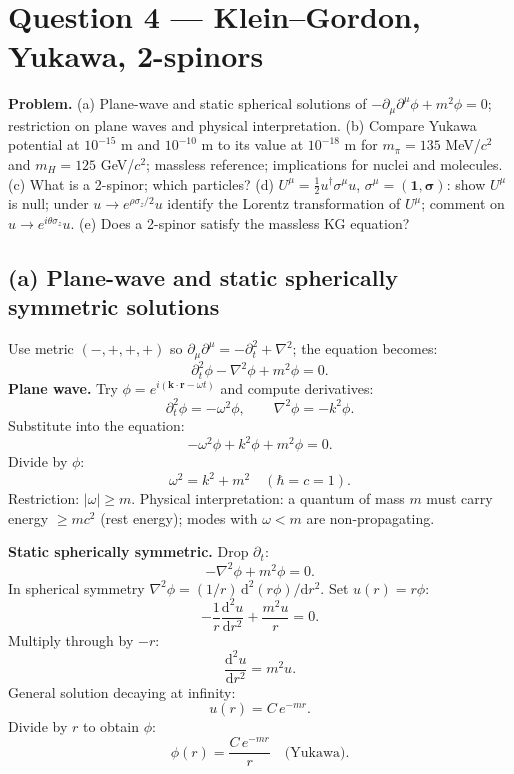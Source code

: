 \documentclass[11pt]{article}
\newcommand{\de}{\mathrm{d}}
\newcommand{\Lap}{\nabla^{2}}
\begin{document}
\section*{Question 4 --- Klein--Gordon, Yukawa, 2-spinors}

\textbf{Problem.} (a) Plane-wave and static spherical solutions of $-\partial_\mu\partial^\mu\phi+m^2\phi=0$; restriction on plane waves and physical interpretation. (b) Compare Yukawa potential at $10^{-15}$ m and $10^{-10}$ m to its value at $10^{-18}$ m for $m_\pi=135$ MeV/$c^2$ and $m_H=125$ GeV/$c^2$; massless reference; implications for nuclei and molecules. (c) What is a 2-spinor; which particles? (d) $U^\mu=\tfrac12 u^\dagger\sigma^\mu u$, $\sigma^\mu=(\bm 1,\bm\sigma)$: show $U^\mu$ is null; under $u\to e^{\rho\sigma_z/2}u$ identify the Lorentz transformation of $U^\mu$; comment on $u\to e^{i\theta\sigma_z}u$. (e) Does a 2-spinor satisfy the massless KG equation?

\subsection*{(a) Plane-wave and static spherically symmetric solutions}

Use metric $(-,+,+,+)$ so $\partial_\mu\partial^\mu = -\partial_t^2 + \Lap$; the equation becomes:
\[ \partial_t^2\phi - \Lap\phi + m^2\phi = 0. \]
\textbf{Plane wave.} Try $\phi = e^{i(\bm k\cdot\bm r - \omega t)}$ and compute derivatives:
\[ \partial_t^2\phi = -\omega^2\phi,\qquad \Lap\phi = -k^2\phi. \]
Substitute into the equation:
\[ -\omega^2\phi + k^2\phi + m^2\phi = 0. \]
Divide by $\phi$:
\begin{equation}
\boxed{\omega^2 = k^2 + m^2\quad(\hbar=c=1).}
\end{equation}
Restriction: $|\omega|\geq m$. Physical interpretation: a quantum of mass $m$ must carry energy $\geq mc^2$ (rest energy); modes with $\omega<m$ are non-propagating.

\textbf{Static spherically symmetric.} Drop $\partial_t$:
\[ -\Lap\phi + m^2\phi = 0. \]
In spherical symmetry $\Lap\phi = (1/r)\,\de^2(r\phi)/\de r^2$. Set $u(r)=r\phi$:
\[ -\frac{1}{r}\frac{\de^2 u}{\de r^2} + \frac{m^2 u}{r} = 0. \]
Multiply through by $-r$:
\[ \frac{\de^2 u}{\de r^2} = m^2 u. \]
General solution decaying at infinity:
\[ u(r) = C\,e^{-mr}. \]
Divide by $r$ to obtain $\phi$:
\begin{equation}
\boxed{\phi(r) = \frac{C\,e^{-mr}}{r}\quad\text{(Yukawa).}}
\label{eq:Q4-Yukawa}
\end{equation}
\end{document}
